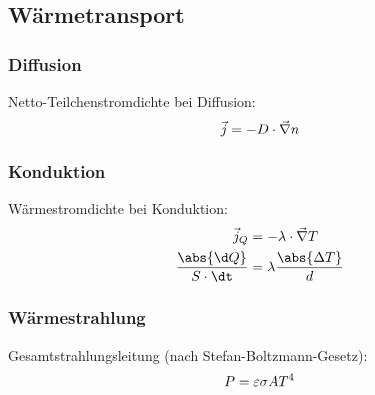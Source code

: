\documentclass[11pt,letterpaper]{article}
\begin{document}
\subsection{Wärmetransport}
{
    \subsubsection{Diffusion}
    {
        Netto-Teilchenstromdichte bei Diffusion:
        \begin{equation*}
            \vec{j} = -D\cdot \vec{\nabla}n\\
        \end{equation*}
    }
    \subsubsection{Konduktion}
    {
        Wärmestromdichte bei Konduktion:
        \begin{align*}
            \vec{j}_Q &= -\lambda\cdot \vec{\nabla}T\\
            \frac{\abs{\d Q}}{S\cdot \dt} &= \lambda \frac{\abs{\Delta T}}{d}
        \end{align*}
    }
    \subsubsection{Wärmestrahlung}
    {
        Gesamtstrahlungsleitung (nach Stefan-Boltzmann-Gesetz):
        \begin{equation*}
            P = \varepsilon \sigma A T^4\\
        \end{equation*}
    }
}
\end{document}
